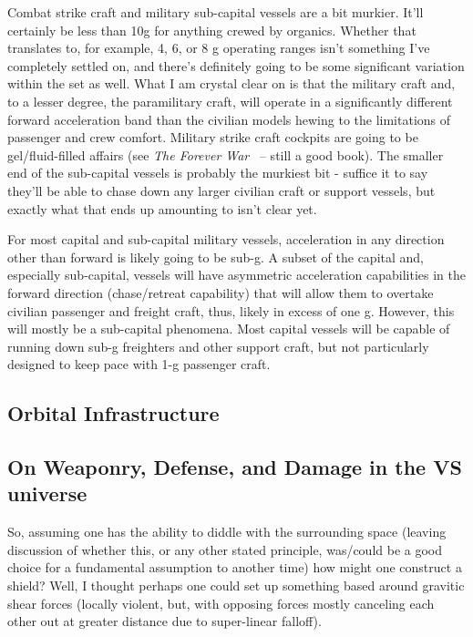 Combat strike craft and military sub-capital vessels are a bit
murkier. It'll certainly be less than 10g for anything crewed by
organics. Whether that translates to, for example, 4, 6, or 8 g
operating ranges isn't something I've completely settled on, and
there's definitely going to be some significant variation within the
set as well. What I am crystal clear on is that the military craft
and, to a lesser degree, the paramilitary craft, will operate in a
significantly different forward acceleration band than the civilian
models hewing to the limitations of passenger and crew
comfort. Military strike craft cockpits are going to be
gel/fluid-filled affairs (see \emph{The Forever War}~\cite{ForeverWar} -- still a good book). The
smaller end of the sub-capital vessels is probably the murkiest bit -
suffice it to say they'll be able to chase down any larger civilian
craft or support vessels, but exactly what that ends up amounting to
isn't clear yet.

For most capital and sub-capital military vessels, acceleration in any
direction other than forward is likely going to be sub-g. A subset of
the capital and, especially sub-capital, vessels will have asymmetric
acceleration capabilities in the forward direction (chase/retreat
capability) that will allow them to overtake civilian passenger and
freight craft, thus, likely in excess of one g. However, this will
mostly be a sub-capital phenomena. Most capital vessels will be
capable of running down sub-g freighters and other support craft, but
not particularly designed to keep pace with 1-g passenger craft.

\subsection{Orbital Infrastructure}

\subsection{On Weaponry, Defense, and Damage in the VS universe}

So, assuming one has the ability to diddle with the surrounding space
(leaving discussion of whether this, or any other stated principle,
was/could be a good choice for a fundamental assumption to another
time) how might one construct a shield?  Well, I thought perhaps one
could set up something based around gravitic shear forces (locally
violent, but, with opposing forces mostly canceling each other out at
greater distance due to super-linear falloff).

